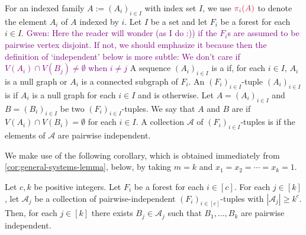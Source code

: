 \documentclass{patmorin}
\newcommand{\pat}[1]{\textcolor{Blue}{[Pat: #1]}}
\newcommand{\gwen}[1]{\textcolor{Purple}{Gwen: #1}}
\newcommand{\mset}[1]{\{\!\{#1\}\!\}}
\begin{document}
For an indexed family $A:=(A_i)_{i\in I}$ with index set $I$, we use $\mathdefin{\pi_i(A)}$ to denote the element $A_i$ of $A$ indexed by $i$.
Let $I$ be a set
and let $F_i$ be a forest for each $i\in I$.
\gwen{Here the reader will wonder (as I do :)) if the $F_i$s are assumed to be pairwise vertex disjoint. 
If not, we should emphasize it because then the definition of `independent' below is more subtle: We don't care if $V(A_i)\cap V(B_j) \neq \emptyset$ when $i\neq j$}
A sequence $(A_i)_{i\in I}$ is a  if, for each $i\in I$, $A_i$ is a null graph or $A_i$ is a connected subgraph of $F_i$.  An $(F_i)_{i\in I}$-tuple $(A_i)_{i\in I}$ is  if $A_i$ is a null graph for each $i\in I$ and is  otherwise. 
Let $A=(A_i)_{i\in I}$ and $B=(B_i)_{i\in I}$ be two $(F_i)_{i\in I}$-tuples.
We say that $A$ and $B$ are  if
$V(A_i)\cap V(B_i)=\emptyset$ for each $i\in I$.
A collection $\mathcal{A}$ of $(F_i)_{i\in I}$-tuples is  if the elements of $\mathcal{A}$ are pairwise independent.


We make use of the following corollary, which is obtained immediately from \cref{cor:general-systems-lemma}, below, by  taking $m=k$ and $x_1=x_2=\cdots=x_k=1$.  

\begin{cor}
\label{cor:interface-for-systems-lemma}
Let $c,k$ be positive integers.
Let $F_i$ be a forest for each $i\in[c]$.
For each $j\in [k]$,
let $\mathcal{A}_j$ be a collection of pairwise-independent $(F_i)_{i\in[c]}$-tuples with $|\mathcal{A}_j|\geq k^c$.
Then, for each $j\in[k]$ there exists 
$B_j \in \mathcal{A}_j$ such that $B_1,\ldots,B_k$ are pairwise independent.
\end{cor}
\end{document}
